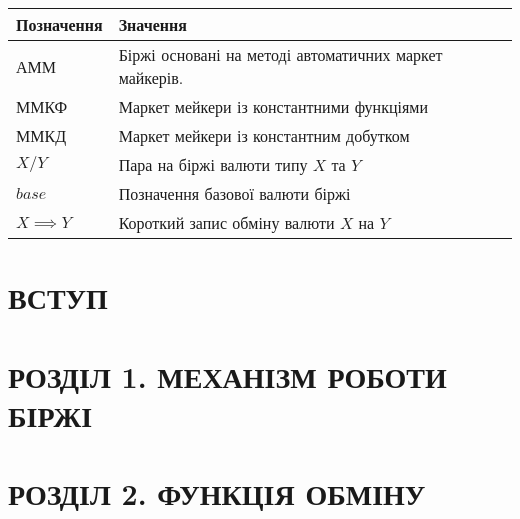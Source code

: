 \documentclass[14pt]{extarticle}
\begin{document}
\begin{center}
	\begin{tabular}{ll}
		Позначення       & Значення                                               \\[0pt]
		\hline{}
		АММ              & Біржі основані на методі автоматичних маркет майкерів. \\[0pt]
		ММКФ             & Маркет мейкери із константними функціями               \\[0pt]
		ММКД             & Маркет мейкери із константним добутком                 \\[0pt]
		\(X/Y\)          & Пара на біржі валюти типу \(X\) та \(Y\)               \\[0pt]
		$base$           & Позначення базової валюти біржі                        \\[0pt]
		\(X \implies Y\) & Короткий запис обміну валюти \(X\) на \(Y\)            \\[0pt]
	\end{tabular}
\end{center}

\newpage

\titleformat{\section}[block]{\Large\bfseries\filcenter}{}{1em}{}
\section*{ВСТУП}\label{sec:intro}


\newpage

\setcounter{section}{0}
\titleformat{\section}[block]{\Large\bfseries\filcenter}{}{1em}{}

\section{РОЗДІЛ 1. МЕХАНІЗМ РОБОТИ БІРЖІ}\label{sec:order-book-cmp}

\newpage

\section{РОЗДІЛ 2. ФУНКЦІЯ ОБМІНУ}\label{sec:swap-function}

\newpage
\end{document}
